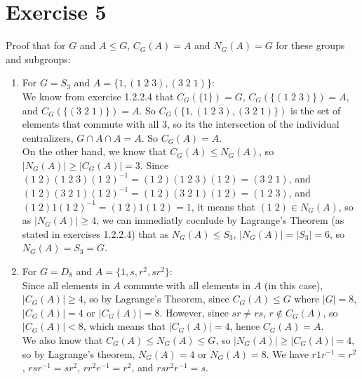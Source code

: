 \documentclass[12pt]{article}
\begin{document}
    \section*{Exercise 5}
    Proof that for $G$ and $A \leqslant G$,
    $C_G(A) = A$ and $N_G(A) = G$ for these groups and subgroups: \\
    \begin{enumerate}[label=\textbf{\alph*.}]
        \item     
            For $G = S_3$ and $A = \{ 1, (1\;2\;3), (3\;2\;1) \}$: \\
            We know from exercise 1.2.2.4 that 
            $C_G(\{1\}) = G$, $C_G(\{(1\;2\;3)\}) = A$,
            and $C_G(\{(3\;2\;1)\}) = A$.
            So $C_G(\{1, (1\;2\;3), (3\;2\;1)\})$ is the set of
            elements that commute with all 3,
            so its the intersection of the individual centralizers,
            $G \cap A \cap A = A$. So $C_G(A) = A$. \\
            On the other hand, we know that $C_G(A) \leqslant N_G(A)$,
            so $|N_G(A)| \geqslant |C_G(A)| = 3$.
            Since $(1\;2)(1\;2\;3)(1\;2)^{-1} = (1\;2)(1\;2\;3)(1\;2)
            = (3\;2\;1)$,
            and $(1\;2)(3\;2\;1)(1\;2)^{-1} = (1\;2)(3\;2\;1)(1\;2)
            = (1\;2\;3)$,
            and $(1\;2)1(1\;2)^{-1} = (1\;2)1(1\;2)
            = 1$,
            it means that $(1\;2) \in N_G(A)$,
            so as $|N_G(A)| \geqslant 4$,
            we can immediatly cocnlude by Lagrange's Theorem
            (as stated in exercises 1.2.2.4)
            that as $N_G(A) \leqslant S_3$, $|N_G(A)| = |S_3| = 6$,
            so $N_G(A) = S_3 = G$.
        \item
            For $G = D_8$ and $A = \{ 1, s, r^2, sr^2 \}$: \\
            Since all elements in $A$ commute with all elements in $A$
            (in this case),
            $|C_G(A)| \geqslant 4$,
            so by Lagrange's Theorem,
            since $C_G(A) \leqslant G$ where $|G| = 8$,
            $|C_G(A)| = 4$ or $|C_G(A)| = 8$.
            However, since $sr \neq rs$, $r \notin C_G(A)$,
            so $|C_G(A)| < 8$,
            which means that $|C_G(A)| = 4$,
            hence $C_G(A) = A$. \\
            We also know that $C_G(A) \leqslant N_G(A) \leqslant G$,
            so $|N_G(A)| \geqslant |C_G(A)| = 4$,
            so by Lagrange's theorem, $N_G(A) = 4$ or $N_G(A) = 8$.
            We have $r1r^{-1} = r^2$, $rsr^{-1} = sr^2$,
            $rr^2r^{-1} = r^2$, and $rsr^2r^{-1} = s$.

\end{enumerate}
\end{document}
